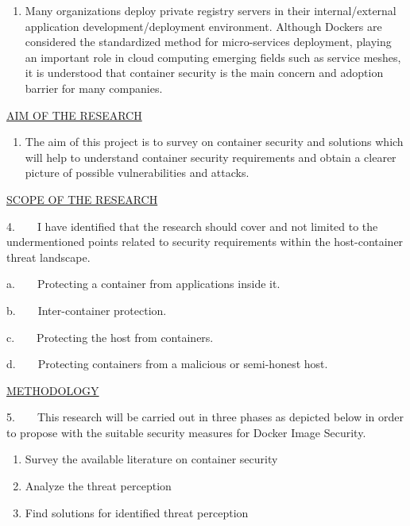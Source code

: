\documentclass[12pt,a4paper]{article}
\begin{document}
\begin{enumerate}
\setcounter{enumi}{\thenumberedCntB}
\item Many organizations deploy private registry servers in their 
internal/external application development/deployment environment. 
Although Dockers are considered the standardized method for 
micro-services deployment, playing an important role in cloud computing 
emerging fields such as service meshes, it is understood that container 
security is the main concern and adoption barrier for many companies. 
\setcounter{numberedCntB}{\theenumi}
\end{enumerate}


\underline{AIM OF THE RESEARCH}



\begin{enumerate}
\setcounter{enumi}{\thenumberedCntB}
\item The aim of this project is to survey on container security and 
solutions which will help to understand container security requirements 
and obtain a clearer picture of possible vulnerabilities and attacks. 
\setcounter{numberedCntB}{\theenumi}
\end{enumerate}


\underline{SCOPE OF THE RESEARCH}



4.\ \ \ \ I have identified that the research should cover and not 
limited to the undermentioned points related to security requirements 
within the host-container threat landscape.

a.\ \ \ \ Protecting a container from applications inside it.

b.\ \ \ \ Inter-container protection.

c.\ \ \ \ Protecting the host from containers.

d.\ \ \ \ Protecting containers from a malicious or semi-honest host.



\underline{METHODOLOGY}

5.\ \ \ \ This research will be carried out in three phases as depicted 
below in order to propose with the suitable security measures for Docker 
Image Security.



\begin{enumerate}
\item Survey the available literature on container security 
\item Analyze the threat perception
\item Find solutions for identified threat perception
\setcounter{numberedCntC}{\theenumi}
\end{enumerate}
\end{document}
